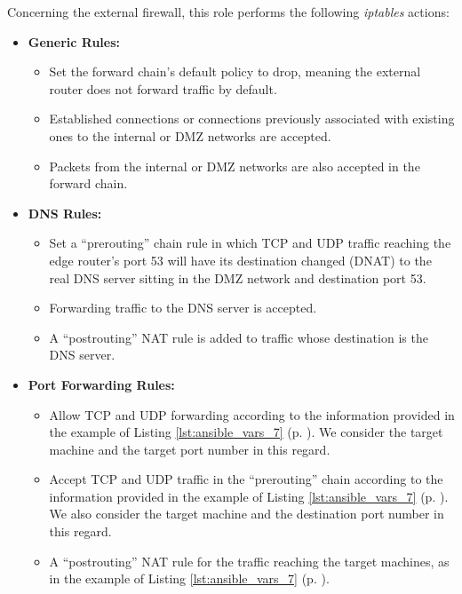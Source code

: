Concerning the external firewall, this role performs the following \textit{iptables} actions:

\begin{itemize}
    \item \textbf{Generic Rules:}
        \begin{itemize}
            \item Set the forward chain's default policy to drop, meaning the external router does not forward traffic by default.
            \item Established connections or connections previously associated with existing ones to the internal or DMZ networks are accepted.
            \item Packets from the internal or DMZ networks are also accepted in the forward chain.
        \end{itemize}
    \item \textbf{DNS Rules:}
        \begin{itemize}
            \item Set a ``prerouting'' chain rule in which TCP and UDP traffic reaching the edge router's port 53 will have its destination changed (DNAT) to the real DNS server sitting in the DMZ network and destination port 53.
            \item Forwarding traffic to the DNS server is accepted.
            \item A ``postrouting'' NAT rule is added to traffic whose destination is the DNS server.
        \end{itemize}
    \item \textbf{Port Forwarding Rules:}
        \begin{itemize}
            \item Allow TCP and UDP forwarding according to the information provided in the example of Listing \ref{lst:ansible_vars_7} (p. \pageref{lst:ansible_vars_7}). We consider the target machine and the target port number in this regard.
            \item Accept TCP and UDP traffic in the ``prerouting'' chain according to the information provided in the example of Listing \ref{lst:ansible_vars_7} (p. \pageref{lst:ansible_vars_7}). We also consider the target machine and the destination port number in this regard.
            \item A ``postrouting'' NAT rule for the traffic reaching the target machines, as in the example of Listing \ref{lst:ansible_vars_7} (p. \pageref{lst:ansible_vars_7}).
        \end{itemize}
\end{itemize}

